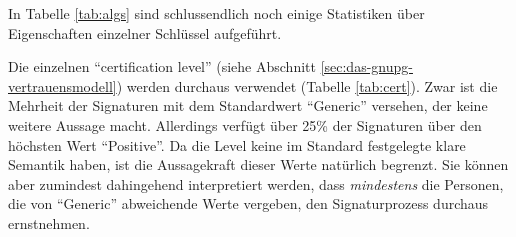 \begin{table}[ht!]
  \footnotesize
  \centering
  \quad
  \quad
  \caption{Verwendung von Hashalgorithmen 
    , Public-Key-Algorithmen  und
    certification levels  in der gr\"ossten starken
    Zusammenhangskomponente}
\end{table}

In Tabelle \ref{tab:algs} sind schlussendlich noch einige Statistiken
\"uber Eigenschaften einzelner Schl\"ussel aufgef\"uhrt. 

Die einzelnen ``certification level'' (siehe Abschnitt
\ref{sec:das-gnupg-vertrauensmodell}) werden durchaus verwendet
(Tabelle \ref{tab:cert}). Zwar ist die Mehrheit der Signaturen mit
dem Standardwert ``Generic'' versehen, der keine weitere Aussage
macht. Allerdings verf\"ugt \"uber 25\% der Signaturen \"uber den
h\"ochsten Wert ``Positive''. Da die Level keine im Standard
festgelegte klare Semantik haben, ist die Aussagekraft dieser Werte
nat\"urlich begrenzt. Sie k\"onnen aber zumindest dahingehend
interpretiert werden, dass \emph{mindestens} die Personen, die von
``Generic'' abweichende Werte vergeben, den Signaturprozess durchaus
ernstnehmen.

